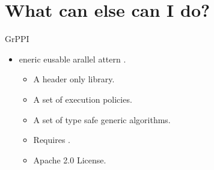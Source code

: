 \section{What can else can I do?}

\begin{frame}[t]{GrPPI}
\begin{Large}
\end{Large}
\vfill\pause
\begin{itemize}
  \item {}eneric eusable arallel
        attern .
    \begin{itemize}
      \item A header only library.
      \item A set of execution policies.
      \item A set of type safe generic algorithms.
      \item Requires .
      \item Apache 2.0 License.
    \end{itemize}
\end{itemize}
\end{frame}



